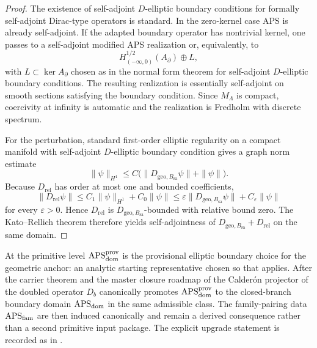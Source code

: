 \begin{proof}
The existence of self-adjoint $D$-elliptic boundary conditions for formally self-adjoint Dirac-type
operators is standard. In the zero-kernel case APS is already self-adjoint. If the adapted
boundary operator has nontrivial kernel, one passes to a self-adjoint modified APS realization or,
equivalently, to
\[
H^{1/2}_{(-\infty,0)}(A_\partial)\oplus L,
\]
with $L\subset\ker A_\partial$ chosen as in the normal form theorem for self-adjoint $D$-elliptic
boundary conditions. The resulting realization is essentially self-adjoint on smooth sections
satisfying the boundary condition. Since $M_\Lambda$ is compact, coercivity at infinity is
automatic and the realization is Fredholm with discrete spectrum.

For the perturbation, standard first-order elliptic regularity on a compact manifold with
self-adjoint $D$-elliptic boundary condition gives a graph norm estimate
\[
\|\psi\|_{H^1}\le C\bigl(\|D_{\mathrm{geo},B_{\mathrm{sa}}}\psi\|+\|\psi\|\bigr).
\]
Because $D_{\mathrm{rel}}$ has order at most one and bounded coefficients,
\[
\|D_{\mathrm{rel}}\psi\|
\le
C_1\|\psi\|_{H^1}+C_0\|\psi\|
\le
\varepsilon\|D_{\mathrm{geo},B_{\mathrm{sa}}}\psi\|+C_\varepsilon\|\psi\|
\]
for every $\varepsilon>0$. Hence $D_{\mathrm{rel}}$ is $D_{\mathrm{geo},B_{\mathrm{sa}}}$-bounded
with relative bound zero. The Kato--Rellich theorem therefore yields self-adjointness of
$D_{\mathrm{geo},B_{\mathrm{sa}}}+D_{\mathrm{rel}}$ on the same domain.
\end{proof}

\begin{remark}
\label{rem:aps-roles}
At the primitive level $\mathrm{APS}_{\mathrm{dom}}^{\mathrm{prov}}$ is the provisional elliptic boundary choice for the
geometric anchor: an analytic starting representative chosen so that
 applies. After the carrier theorem and the master
closure roadmap of  the Calder\'on projector of the doubled operator
$D_b$ canonically promotes $\mathrm{APS}_{\mathrm{dom}}^{\mathrm{prov}}$ to the closed-branch boundary domain $\mathrm{APS}_{\mathrm{dom}}$ in the
same admissible class. The family-pairing data $\mathrm{APS}_{\mathrm{fam}}$ are then induced canonically and remain
a derived consequence rather than a second primitive input package. The explicit upgrade
statement is recorded as  in .
\end{remark}

